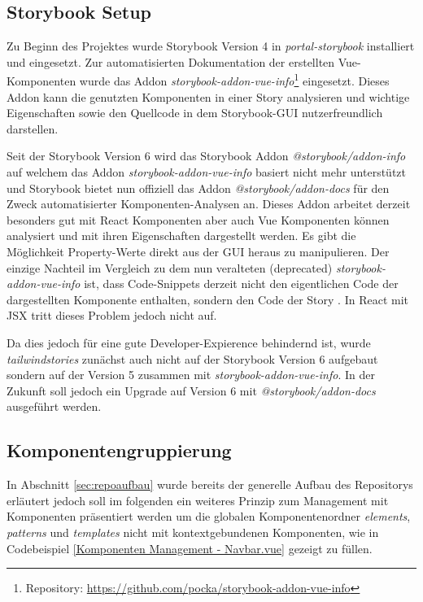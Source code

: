 \subsection{Storybook Setup}
\label{sec:storybooksetup}
Zu Beginn des Projektes wurde Storybook Version 4 in \textit{portal-storybook} installiert und eingesetzt. Zur automatisierten Dokumentation der erstellten Vue-Komponenten wurde das Addon \textit{storybook-addon-vue-info}\footnote{Repository: \url{https://github.com/pocka/storybook-addon-vue-info}} eingesetzt. Dieses Addon kann die genutzten Komponenten in einer Story analysieren und wichtige Eigenschaften sowie den Quellcode in dem Storybook-GUI nutzerfreundlich darstellen.

Seit der Storybook Version 6 wird das Storybook Addon \textit{@storybook/addon-info} auf welchem das Addon \textit{storybook-addon-vue-info} basiert nicht mehr unterstützt und Storybook bietet nun offiziell das Addon \textit{@storybook/addon-docs} für den Zweck automatisierter Komponenten-Analysen an. Dieses Addon arbeitet derzeit besonders gut mit React Komponenten aber auch Vue Komponenten können analysiert und mit ihren Eigenschaften dargestellt werden. Es gibt die Möglichkeit Property-Werte direkt aus der GUI heraus zu manipulieren. Der einzige Nachteil im Vergleich zu dem nun veralteten (deprecated) \textit{storybook-addon-vue-info} ist, dass Code-Snippets derzeit nicht den eigentlichen Code der dargestellten Komponente enthalten, sondern den Code der Story \citep{GithubIssueStorybook}. In React mit JSX tritt dieses Problem jedoch nicht auf.

Da dies jedoch für eine gute Developer-Expierence behindernd ist, wurde \textit{tailwindstories} zunächst auch nicht auf der Storybook Version 6 aufgebaut sondern auf der Version 5 zusammen mit \textit{storybook-addon-vue-info}. In der Zukunft soll jedoch ein Upgrade auf Version 6 mit \textit{@storybook/addon-docs} ausgeführt werden.

\subsection{Komponentengruppierung}
In Abschnitt \ref{sec:repoaufbau} wurde bereits der generelle Aufbau des Repositorys erläutert jedoch soll im folgenden ein weiteres Prinzip zum Management mit Komponenten präsentiert werden um die globalen Komponentenordner \textit{elements}, \textit{patterns} und \textit{templates} nicht mit kontextgebundenen Komponenten, wie in Codebeispiel \ref{Komponenten Management - Navbar.vue} gezeigt zu füllen.


